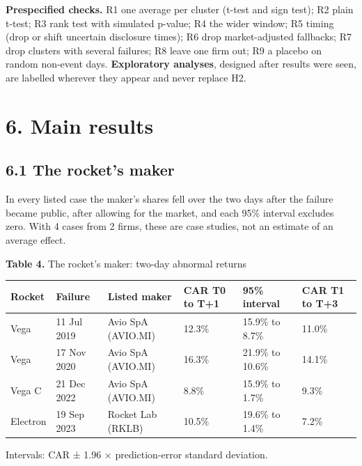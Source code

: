 \documentclass[12pt,a4paper]{article}
\begin{document}
\textbf{Prespecified checks.} R1 one average per cluster (t-test and sign test); R2 plain t-test; R3 rank test with simulated p-value; R4 the wider window; R5 timing (drop or shift uncertain disclosure times); R6 drop market-adjusted fallbacks; R7 drop clusters with several failures; R8 leave one firm out; R9 a placebo on random non-event days. \textbf{Exploratory analyses}, designed after results were seen, are labelled wherever they appear and never replace H2.

\section*{6. Main results}
\subsection*{6.1 The rocket's maker}
In every listed case the maker's shares fell over the two days after the failure became public, after allowing for the market, and each 95\% interval excludes zero. With 4 cases from 2 firms, these are case studies, not an estimate of an average effect.

\par\noindent\begin{minipage}{\textwidth}
\textbf{Table 4.} The rocket's maker: two-day abnormal returns

{\small\setlength{\tabcolsep}{4pt}\begin{tabularx}{\textwidth}{llXlll}
\toprule
\textbf{Rocket} & \textbf{Failure} & \textbf{Listed maker} & \textbf{CAR T0 to T+1} & \textbf{95\% interval} & \textbf{CAR T\textminus{}1 to T+3} \\
\midrule
Vega & 11 Jul 2019 & Avio SpA (AVIO.MI) & \textminus{}12.3\% & \textminus{}15.9\% to \textminus{}8.7\% & \textminus{}11.0\% \\
Vega & 17 Nov 2020 & Avio SpA (AVIO.MI) & \textminus{}16.3\% & \textminus{}21.9\% to \textminus{}10.6\% & \textminus{}14.1\% \\
Vega C & 21 Dec 2022 & Avio SpA (AVIO.MI) & \textminus{}8.8\% & \textminus{}15.9\% to \textminus{}1.7\% & \textminus{}9.3\% \\
Electron & 19 Sep 2023 & Rocket Lab (RKLB) & \textminus{}10.5\% & \textminus{}19.6\% to \textminus{}1.4\% & \textminus{}7.2\% \\
\bottomrule
\end{tabularx}}
\vspace{6pt}

Intervals: CAR ± 1.96 × prediction-error standard deviation.

\end{minipage}\par\vspace{4pt}
\end{document}
